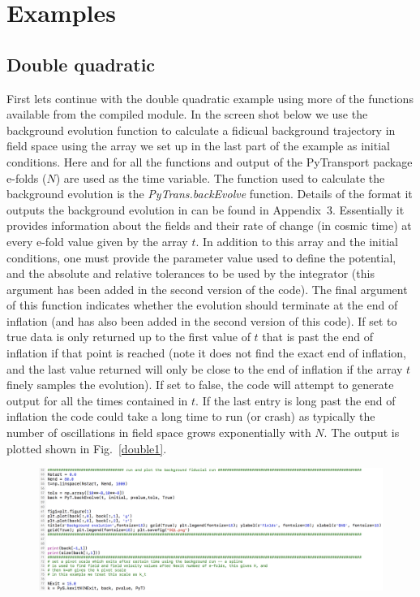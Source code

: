 \documentclass[10pt,
amsmath,amssymb,
aps,prd,nofootinbib,eqsecnum,a4paper]{revtex4}
\begin{document}
\section{Examples}
\label{Examples}

\subsection{Double quadratic}

First lets continue with the double quadratic example using more of the functions 
available from the compiled module. In the screen shot below we use the background evolution 
function to calculate a fidicual background trajectory in field space using the array we set up in the last 
part of the example as initial conditions. Here and for all the functions and output of 
the PyTransport package e-folds ($N$) are used as the time variable.
The function used to calculate the background evolution is the {\it PyTrans.backEvolve} function. 
Details of the format it outputs the background evolution in can be found in Appendix~3. Essentially it provides 
information about the fields and their rate of change (in cosmic time) at every e-fold value given by 
the array $t$. 
In addition to this array and the initial conditions, 
one must provide the parameter value used to define the potential, and the absolute and 
relative tolerances to be used by the integrator (this argument has been added 
in the second version of the code). 
The final argument of this function indicates whether the evolution should terminate at the end of inflation 
(and has also been added in the second version of this code).
If set to true data is only returned up to the first value of $t$ that is past the end of inflation if that point is reached (note it does not 
find the exact end of inflation, and the last value returned will only be close to the end of inflation if the array $t$ 
finely samples the evolution). If set to false, the code will attempt to generate output for all the times contained in $t$. If the 
last entry is long past the end of inflation the code could take a long time to run (or crash) as typically 
the number of oscillations in field space grows exponentially with $N$.
The output is plotted shown in Fig.~\ref{double1}. 
\begin{figure}[H]
\centering
\includegraphics[width=18.cm]{Shot3c}
\end{figure}
\end{document}
